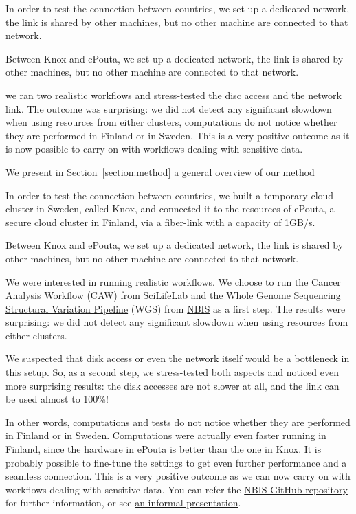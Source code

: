 \cutafter


In order to test the connection between countries, 
we set up a dedicated network, \ie the link
is shared by other machines, but no other machine are connected to
that network.

Between Knox and ePouta, we set up a dedicated network, \ie the link
is shared by other machines, but no other machine are connected to
that network.

we ran two
realistic workflows and stress-tested the disc access and the network
link.
%
The outcome was surprising: we did not detect any significant slowdown
when using resources from either clusters, \ie computations do not
notice whether they are performed in Finland or in Sweden.
%
This is a very positive outcome as it is now possible to carry on with
workflows dealing with sensitive data.



We present in Section~\ref{section:method} a general overview of our
method




In order to test the connection between countries, we built a
temporary cloud cluster in Sweden, called Knox, and connected it to
the resources of ePouta, a secure cloud cluster in Finland, via a
fiber-link with a capacity of 1GB/s.

Between Knox and ePouta, we set up a dedicated network, \ie the link
is shared by other machines, but no other machine are connected to
that network.

We were interested in running realistic workflows. We choose to run
the \href{https://github.com/SciLifeLab/CAW}{Cancer Analysis Workflow}
(CAW) from SciLifeLab and the
\href{https://github.com/NBISweden/wgs-structvar}{Whole Genome
Sequencing Structural Variation Pipeline} (WGS) from
\href{http://www.nbis.se}{NBIS} as a first step. The results were
surprising: we did not detect any significant slowdown when using
resources from either clusters.

We suspected that disk access or even the network itself would be a
bottleneck in this setup. So, as a second step, we stress-tested both
aspects and noticed even more surprising results: the disk accesses
are not slower at all, and the link can be used almost to 100\%!

In other words, computations and tests do not notice whether they are
performed in Finland or in Sweden. Computations were actually even
faster running in Finland, since the hardware in ePouta is better than
the one in Knox. It is probably possible to fine-tune the settings to
get even further performance and a seamless connection. This is a very
positive outcome as we can now carry on with workflows dealing with
sensitive data. You can refer the
\href{https://github.com/NBISweden/Knox-ePouta}{NBIS GitHub
repository} for further information, or see
\href{https://NBISweden.github.io/Knox-ePouta/informal/}{an informal
presentation}.



